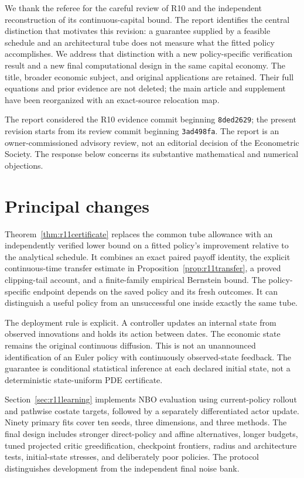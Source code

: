 We thank the referee for the careful review of R10 and the independent reconstruction of its continuous-capital bound. The report identifies the central distinction that motivates this revision: a guarantee supplied by a feasible schedule and an architectural tube does not measure what the fitted policy accomplishes. We address that distinction with a new policy-specific verification result and a new final computational design in the same capital economy. The title, broader economic subject, and original applications are retained. Their full equations and prior evidence are not deleted; the main article and supplement have been reorganized with an exact-source relocation map.

The report considered the R10 evidence commit beginning \texttt{8ded2629}; the present revision starts from its review commit beginning \texttt{3ad498fa}. The report is an owner-commissioned advisory review, not an editorial decision of the Econometric Society. The response below concerns its substantive mathematical and numerical objections.

\section*{Principal changes}
Theorem~\ref{thm:r11certificate} replaces the common tube allowance with an independently verified lower bound on a fitted policy's improvement relative to the analytical schedule. It combines an exact paired payoff identity, the explicit continuous-time transfer estimate in Proposition~\ref{prop:r11transfer}, a proved clipping-tail account, and a finite-family empirical Bernstein bound. The policy-specific endpoint depends on the saved policy and its fresh outcomes. It can distinguish a useful policy from an unsuccessful one inside exactly the same tube.

The deployment rule is explicit. A controller updates an internal state from observed innovations and holds its action between dates. The economic state remains the original continuous diffusion. This is not an unannounced identification of an Euler policy with continuously observed-state feedback. The guarantee is conditional statistical inference at each declared initial state, not a deterministic state-uniform PDE certificate.

Section~\ref{sec:r11learning} implements NBO evaluation using current-policy rollout and pathwise costate targets, followed by a separately differentiated actor update. Ninety primary fits cover ten seeds, three dimensions, and three methods. The final design includes stronger direct-policy and affine alternatives, longer budgets, tuned projected critic greedification, checkpoint frontiers, radius and architecture tests, initial-state stresses, and deliberately poor policies. The protocol distinguishes development from the independent final noise bank.

